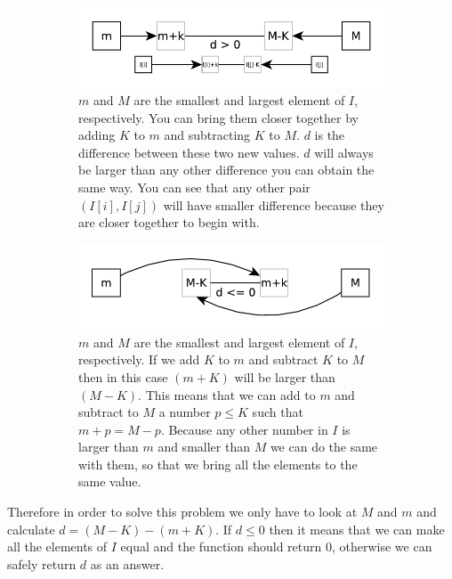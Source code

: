 \begin{figure}
	\vspace*{-0.5in}
	\centering
	\begin{subfigure}[t]{0.90\textwidth}
		\includegraphics[width=\textwidth]{sources/smallest_range/images/explanation1} 
		\caption{$m$ and $M$ are the smallest and largest element of $I$, respectively. You can
		bring them closer together by adding $K$ to $m$ and subtracting $K$ to $M$. $d$ is the
		difference between these two new values. $d$ will always be larger than any other difference
		you can obtain the same way. You can see that any other pair $(I[i], I[j])$ will have
		smaller difference because they are closer together to begin with.}
		\label{fig:smallest_range:explanation1} 
	 \end{subfigure}
	\hfill
	\begin{subfigure}[t]{0.90\textwidth}
		\includegraphics[width=\textwidth]{sources/smallest_range/images/explanation2} 
		\caption{$m$ and $M$ are the smallest and largest element of $I$, respectively. If we  add
		$K$ to $m$ and subtract $K$ to $M$ then in this case $(m+K)$ will be larger than $(M-K)$. This
		means that we can add to $m$ and subtract to $M$ a number $p \leq K$ such that $m+p = M-p$.
		Because any other number in $I$ is larger than $m$ and smaller than $M$ we can do the same
		with them, so that we bring all the elements to the same value.}
		\label{fig:smallest_range:explanation2} 
	 \end{subfigure}
	 \hfill
	 \label{}
	 \caption{}
\end{figure}
Therefore in order to solve this problem we only have to look at $M$ and $m$ and calculate
$d=(M-K)-(m+K)$. If $d \leq 0$ then it means that we can make all the elements of $I$ equal and the
function should return $0$, otherwise we can safely return $d$ as an answer.

